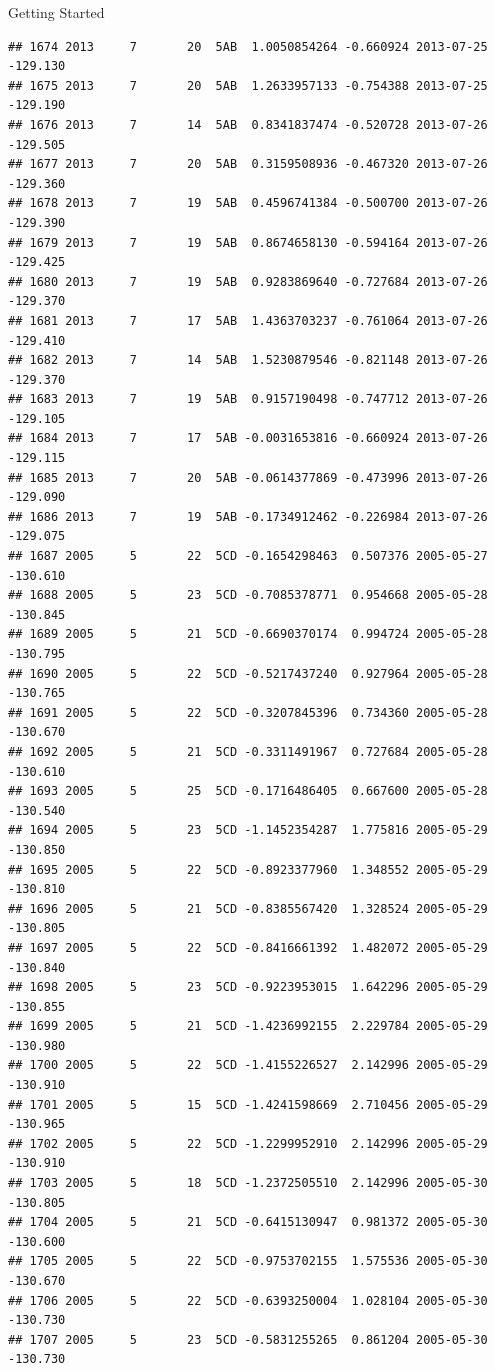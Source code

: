 \documentclass[
  ignorenonframetext,
]{beamer}
\begin{document}
\begin{frame}[fragile]{Getting Started}
\begin{verbatim}
## 1674 2013     7       20  5AB  1.0050854264 -0.660924 2013-07-25 -129.130
## 1675 2013     7       20  5AB  1.2633957133 -0.754388 2013-07-25 -129.190
## 1676 2013     7       14  5AB  0.8341837474 -0.520728 2013-07-26 -129.505
## 1677 2013     7       20  5AB  0.3159508936 -0.467320 2013-07-26 -129.360
## 1678 2013     7       19  5AB  0.4596741384 -0.500700 2013-07-26 -129.390
## 1679 2013     7       19  5AB  0.8674658130 -0.594164 2013-07-26 -129.425
## 1680 2013     7       19  5AB  0.9283869640 -0.727684 2013-07-26 -129.370
## 1681 2013     7       17  5AB  1.4363703237 -0.761064 2013-07-26 -129.410
## 1682 2013     7       14  5AB  1.5230879546 -0.821148 2013-07-26 -129.370
## 1683 2013     7       19  5AB  0.9157190498 -0.747712 2013-07-26 -129.105
## 1684 2013     7       17  5AB -0.0031653816 -0.660924 2013-07-26 -129.115
## 1685 2013     7       20  5AB -0.0614377869 -0.473996 2013-07-26 -129.090
## 1686 2013     7       19  5AB -0.1734912462 -0.226984 2013-07-26 -129.075
## 1687 2005     5       22  5CD -0.1654298463  0.507376 2005-05-27 -130.610
## 1688 2005     5       23  5CD -0.7085378771  0.954668 2005-05-28 -130.845
## 1689 2005     5       21  5CD -0.6690370174  0.994724 2005-05-28 -130.795
## 1690 2005     5       22  5CD -0.5217437240  0.927964 2005-05-28 -130.765
## 1691 2005     5       22  5CD -0.3207845396  0.734360 2005-05-28 -130.670
## 1692 2005     5       21  5CD -0.3311491967  0.727684 2005-05-28 -130.610
## 1693 2005     5       25  5CD -0.1716486405  0.667600 2005-05-28 -130.540
## 1694 2005     5       23  5CD -1.1452354287  1.775816 2005-05-29 -130.850
## 1695 2005     5       22  5CD -0.8923377960  1.348552 2005-05-29 -130.810
## 1696 2005     5       21  5CD -0.8385567420  1.328524 2005-05-29 -130.805
## 1697 2005     5       22  5CD -0.8416661392  1.482072 2005-05-29 -130.840
## 1698 2005     5       23  5CD -0.9223953015  1.642296 2005-05-29 -130.855
## 1699 2005     5       21  5CD -1.4236992155  2.229784 2005-05-29 -130.980
## 1700 2005     5       22  5CD -1.4155226527  2.142996 2005-05-29 -130.910
## 1701 2005     5       15  5CD -1.4241598669  2.710456 2005-05-29 -130.965
## 1702 2005     5       22  5CD -1.2299952910  2.142996 2005-05-29 -130.910
## 1703 2005     5       18  5CD -1.2372505510  2.142996 2005-05-30 -130.805
## 1704 2005     5       21  5CD -0.6415130947  0.981372 2005-05-30 -130.600
## 1705 2005     5       22  5CD -0.9753702155  1.575536 2005-05-30 -130.670
## 1706 2005     5       22  5CD -0.6393250004  1.028104 2005-05-30 -130.730
## 1707 2005     5       23  5CD -0.5831255265  0.861204 2005-05-30 -130.730

\end{verbatim}
\end{frame}
\end{document}
